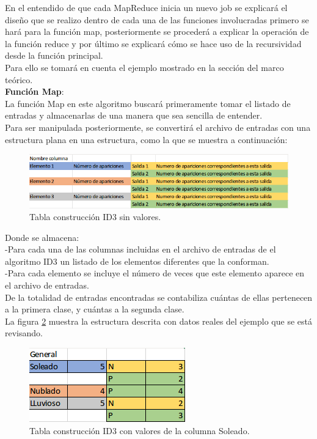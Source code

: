 En el entendido de que cada MapReduce inicia un nuevo job se explicará el diseño que se realizo dentro de cada una de las funciones involucradas primero se hará para la función map, posteriormente se procederá a explicar la operación de la función reduce y por último se explicará cómo se hace uso de la recursividad desde la función principal.
\\
Para ello se tomará en cuenta el ejemplo mostrado en la sección  del marco teórico.\\
\textbf{Función Map}:
\\
La función Map en este algoritmo buscará primeramente tomar el listado de entradas y almacenarlas de una manera que sea sencilla de entender. \\
Para ser manipulada posteriormente, se convertirá el archivo de entradas con una estructura plana en una estructura, como la que se muestra a continuación:
\\
\begin{figure}[H]
	\begin{center}
		\hypertarget{fig:tablaID3}{\hspace{1pt}}
		\includegraphics[width=.9\textwidth]{capitulo4a/images/tablaid3sinvalores.png}
		\caption{Tabla construcción ID3 sin valores.}
		\label{fig:tablaID3}
	\end{center}
\end{figure}
Donde se almacena:\\
-Para cada una de las columnas incluidas en el archivo de entradas de el algoritmo ID3 un listado de los elementos diferentes que la conforman.\\
-Para cada elemento se incluye el número de veces que este elemento aparece en el archivo de entradas.\\
De la totalidad de entradas encontradas se contabiliza cuántas de ellas pertenecen a la primera clase, y cuántas a la segunda clase.\\
La figura \ref{fig:tablaID32} muestra la estructura descrita con datos reales del ejemplo que se está revisando.
\begin{figure}[H]
	\begin{center}
		\hypertarget{fig:tablaID32}{\hspace{1pt}}
		\includegraphics[width=.5\textwidth]{capitulo4a/images/tablaid3.png}
		\caption{Tabla construcción ID3 con valores de la columna Soleado.}
		\label{fig:tablaID32}
	\end{center}
\end{figure}
